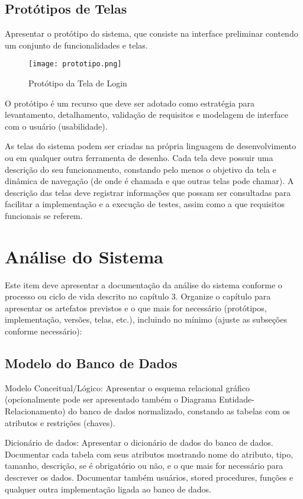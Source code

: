 \documentclass[a4paper,12pt]{article}
\begin{document}
\clearpage

\subsection{Protótipos de Telas}
Apresentar o protótipo do sistema, que consiste na interface preliminar contendo um conjunto de funcionalidades e telas. 

\begin{figure}[h]
    \centering
    \texttt{[image: prototipo.png]}
    \caption{Protótipo da Tela de Login}
    \label{fig:prototipo_login}
\end{figure}

O protótipo é um recurso que deve ser adotado como estratégia para levantamento, detalhamento, validação de requisitos e modelagem de interface com o usuário (usabilidade).

As telas do sistema podem ser criadas na própria linguagem de desenvolvimento ou em qualquer outra ferramenta de desenho. Cada tela deve possuir uma descrição do seu funcionamento, constando pelo menos o objetivo da tela e dinâmica de navegação (de onde é chamada e que outras telas pode chamar). A descrição das telas deve registrar informações que possam ser consultadas para facilitar a implementação e a execução de testes, assim como a que requisitos funcionais se referem.

\newpage
\section{Análise do Sistema}
Este item deve apresentar a documentação da análise do sistema conforme o processo ou ciclo de vida descrito no capítulo 3. Organize o capítulo para apresentar os artefatos previstos e o que mais for necessário (protótipos, implementação, versões, telas, etc.), incluindo no mínimo (ajuste as subseções conforme necessário):

\subsection{Modelo do Banco de Dados}
Modelo Conceitual/Lógico: Apresentar o esquema relacional gráfico (opcionalmente pode ser apresentado também o Diagrama Entidade-Relacionamento) do banco de dados normalizado, constando as tabelas com os atributos e restrições (chaves).

Dicionário de dados: Apresentar o dicionário de dados do banco de dados. Documentar cada tabela com seus atributos mostrando nome do atributo, tipo, tamanho, descrição, se é obrigatório ou não, e o que mais for necessário para descrever os dados. Documentar também usuários, stored procedures, funções e qualquer outra implementação ligada ao banco de dados.
\end{document}
